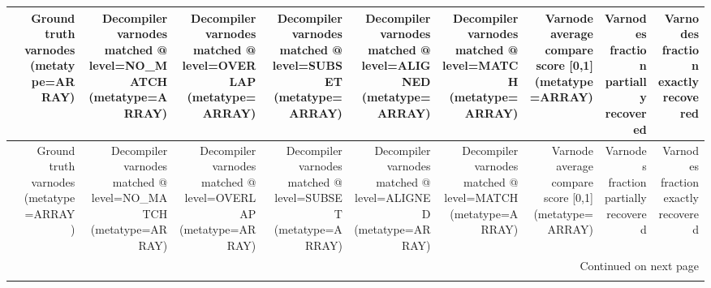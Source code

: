 \begin{longtable}{lrrrrrrrrr}
\toprule
{} &  Ground truth varnodes (metatype=ARRAY) &  Decompiler varnodes matched @ level=NO\_MATCH (metatype=ARRAY) &  Decompiler varnodes matched @ level=OVERLAP (metatype=ARRAY) &  Decompiler varnodes matched @ level=SUBSET (metatype=ARRAY) &  Decompiler varnodes matched @ level=ALIGNED (metatype=ARRAY) &  Decompiler varnodes matched @ level=MATCH (metatype=ARRAY) &  Varnode average compare score {[}0,1] (metatype=ARRAY) &  Varnodes fraction partially recovered &  Varnodes fraction exactly recovered \\
\midrule
\endfirsthead

\toprule
{} &  Ground truth varnodes (metatype=ARRAY) &  Decompiler varnodes matched @ level=NO\_MATCH (metatype=ARRAY) &  Decompiler varnodes matched @ level=OVERLAP (metatype=ARRAY) &  Decompiler varnodes matched @ level=SUBSET (metatype=ARRAY) &  Decompiler varnodes matched @ level=ALIGNED (metatype=ARRAY) &  Decompiler varnodes matched @ level=MATCH (metatype=ARRAY) &  Varnode average compare score {[}0,1] (metatype=ARRAY) &  Varnodes fraction partially recovered &  Varnodes fraction exactly recovered \\
\midrule
\endhead
\midrule
\multicolumn{10}{r}{{Continued on next page}} \\
\midrule
\endfoot


\end{longtable}
